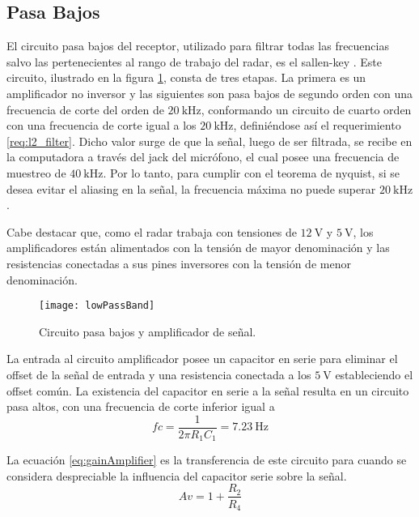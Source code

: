 \subsection{Pasa Bajos}

El circuito pasa bajos del receptor, utilizado para filtrar todas las frecuencias salvo las pertenecientes al rango de trabajo del radar, es el sallen-key \cite{Unwin2003}. Este circuito, ilustrado en la figura \ref{fig:lowPassCircuit}, consta de tres etapas. La primera es un amplificador no inversor y las siguientes son pasa bajos de segundo orden con una frecuencia de corte del orden de $\SI{20}{\kHz}$, conformando un circuito de cuarto orden con una frecuencia de corte igual a los $\SI{20}{\kHz}$, definiéndose así el requerimiento \ref{req:l2_filter}. Dicho valor surge de que la señal, luego de ser filtrada, se recibe en la computadora a través del jack del micrófono, el cual posee una frecuencia de muestreo de $\SI{40}{\kHz}$. Por lo tanto, para cumplir con el teorema de nyquist, si se desea evitar el aliasing en la señal, la frecuencia máxima no puede superar $\SI{20}{\kHz}$.

Cabe destacar que, como el radar trabaja con tensiones de $\SI{12}{\volt}$ y $\SI{5}{\volt}$, los amplificadores están alimentados con la tensión de mayor denominación y las resistencias conectadas a sus pines inversores con la tensión de menor denominación.

\begin{figure}
 \centering
 \texttt{[image: lowPassBand]}
 \caption{Circuito pasa bajos y amplificador de señal.}
 \label{fig:lowPassCircuit}
\end{figure}

La entrada al circuito amplificador posee un capacitor en serie para eliminar el offset de la señal de entrada y una resistencia conectada a los $\SI{5}{\volt}$ estableciendo el offset común. La existencia del capacitor en serie a la señal resulta en un circuito pasa altos, con una frecuencia de corte inferior igual a
\begin{equation}\label{eq:fcInf}
  fc = \dfrac{1}{2\pi R_1 C_1} = \SI{7.23}{\Hz}
\end{equation}

La ecuación \ref{eq:gainAmplifier} es la transferencia de este circuito para cuando se considera despreciable la influencia del capacitor serie sobre la señal.
\begin{equation}\label{eq:gainAmplifier}
  Av = 1 + \dfrac{R_2}{R_4}
\end{equation}

